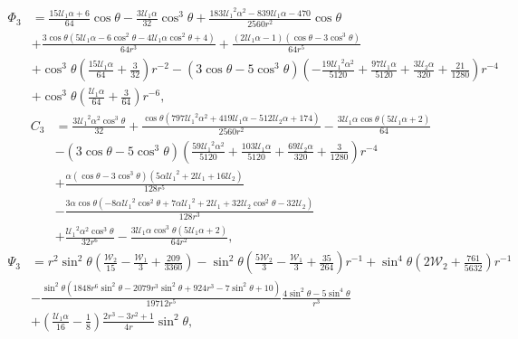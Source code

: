 \documentclass[MSc,beforeExam]{iitcsthesis}
\newcommand\cU{\mathscr{U}}
\newcommand\cW{\mathscr{W}}
\begin{document}
\begin{align*}
\varPhi_3 &= \frac{15\cU_1\alpha + 6 }{64}\cos\theta  - \frac{3 \cU_1\alpha}{32} {\cos}^3\theta
 + \frac{183 {\cU_1}^2\alpha^2 - 839 \cU_1\alpha - 470}{2560 r^2} \cos\theta 
\\ \nonumber &
+ \frac{3 \cos\theta \left(5 \cU_1\alpha - 6 {\cos^2\theta} - 4 \cU_1\alpha {\cos^2\theta} + 4\right)}{64 r^3} + \frac{\left(2 \cU_1\alpha - 1\right) \left(\cos\theta - 3 {\cos}^3\theta\right)}{64 r^5} 
\\ &+ {{\cos}^3\theta \left(\frac{15 \cU_1\alpha}{64} + \frac{3}{32}\right)}{r^{-2}} 
- \left(3 \cos\theta - 5 {\cos}^3\theta\right) \left( - \frac{19 {\cU_1}^2\alpha^2}{5120} + \frac{97 \cU_1\alpha}{5120} + \frac{3 \cU_2\alpha}{320} + \frac{21}{1280}\right){r^{-4}} 
\\ \nonumber &
+ {{\cos}^3\theta \left(\frac{\cU_1\alpha}{64} + \frac{3}{64}\right)}{r^{-6}},
\end{align*}
\begin{align*}
C_3 &=
\frac{3 {{\cU_1}}^2\alpha^2 {\cos^3\theta}}{32} + \frac{\cos\theta \left(797 {{\cU_1}}^2\alpha^2 + 419 {\cU_1}\alpha - 512 {\cU_2}\alpha + 174\right)}{2560 r^2} 
- \frac{3 {\cU_1}\alpha \cos\theta \left(5 {\cU_1}\alpha + 2\right)}{64} 
\\ \nonumber &
- {\left(3 \cos\theta - 5 {\cos^3\theta}\right) \left(\frac{59 {{\cU_1}}^2\alpha^2}{5120} + \frac{103 {\cU_1}\alpha}{5120} + \frac{69 {\cU_2}\alpha}{320} + \frac{3}{1280}\right)}{r^{-4}} 
\\ \nonumber &
+ \frac{\alpha \left(\cos\theta - 3 {\cos^3\theta}\right) \left(5\alpha {{\cU_1}}^2 + 2 {\cU_1} + 16 {\cU_2}\right)}{128 r^5} 
\\ \nonumber &
- \frac{3\alpha \cos\theta \left( - 8\alpha {{\cU_1}}^2 {\cos^2\theta} + 7\alpha {{\cU_1}}^2 + 2 {\cU_1} + 32 {\cU_2} {\cos^2\theta} - 32 {\cU_2}\right)}{128 r^3} 
\\ \nonumber &
+ \frac{{{\cU_1}}^2\alpha^2 {\cos^3\theta}}{32 r^6} - \frac{3 {\cU_1}\alpha {\cos^3\theta} \left(5 {\cU_1}\alpha + 2\right)}{64 r^2},
\end{align*}
\begin{align*}
\Psi_3 &=
r^2 {\sin^2\theta} \left(\frac{{\cW_2}}{15} - \frac{{\cW_1}}{3} + \frac{209}{3360}\right) 
 - {{\sin^2\theta} \left(\frac{5 {\cW_2}}{3} - \frac{{\cW_1}}{3} + \frac{35}{264}\right)}{r^{-1}}
 + {{\sin^4\theta} \left(2 {\cW_2} + \frac{761}{5632}\right)}{r^{-1}} 
\\ \nonumber & 
- \frac{{\sin^2\theta} \left(1848 r^6 {\sin^2\theta} - 2079 r^3 {\sin^2\theta} + 924 r^3 - 7 {\sin^2\theta} + 10\right)}{19712 r^5} 
\frac{4 {\sin^2\theta} - 5 {\sin^4\theta}}{r^3} \\ & + \left(\frac{{\cU_1}\alpha}{16} - \frac{1}{8}\right) \frac{2 r^3 - 3 r^2 + 1}{4 r} {\sin^2\theta},
\end{align*}
\end{document}
